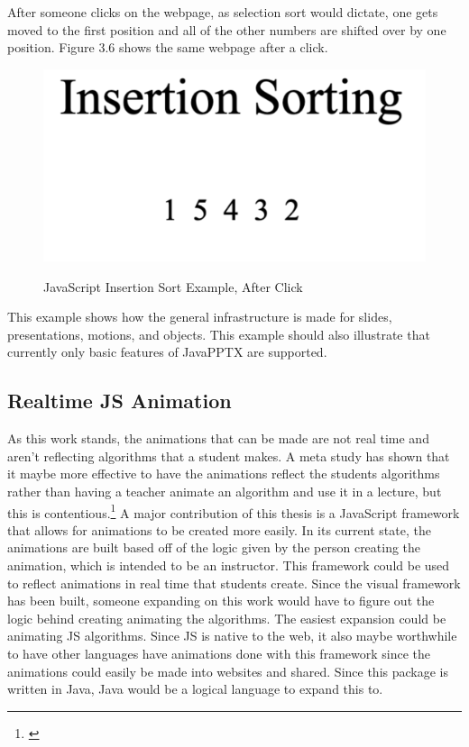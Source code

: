 \documentclass[12pt,twoside]{reedthesis}
\begin{document}
After someone clicks on the webpage, as selection sort would dictate, one gets moved to the first position and all of the other numbers are shifted over by one position. Figure 3.6 shows the same webpage after a click. 
\begin{figure}[htbp] 
\begin{centering} 
\caption{JavaScript Insertion Sort Example, After Click} 
\includegraphics[scale=0.7]{insafter} 
\label{subd}
\end{centering} 
\end{figure}
This example shows how the general infrastructure is made for slides, presentations, motions, and objects. This example should also illustrate that currently only basic features of JavaPPTX are supported. 


\subsection{Realtime JS Animation}
As this work stands, the animations that can be made are not real time and aren't reflecting algorithms that a student makes. A meta study has shown that it maybe more effective to have the animations reflect the students algorithms rather than having a teacher animate an algorithm and use it in a lecture, but this is contentious.\footnote{\cite{hundhausen_meta-study_2002}} A major contribution of this thesis is a JavaScript framework that allows for animations to be created more easily. In its current state, the animations are built based off of the logic given by the person creating the animation, which is intended to be an instructor. This framework could be used to reflect animations in real time that students create. Since the visual framework has been built, someone expanding on this work would have to figure out the logic behind creating animating the algorithms. The easiest expansion could be animating JS algorithms. Since JS is native to the web, it also maybe worthwhile to have other languages have animations done with this framework since the animations could easily be made into websites and shared. Since this package is written in Java, Java would be a logical language to expand this to. 
\end{document}
